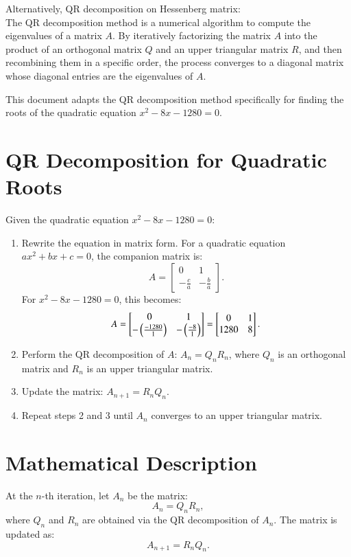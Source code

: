 \documentclass[journal]{IEEEtran}
\begin{document}
Alternatively, QR decomposition on Hessenberg matrix:\\
The QR decomposition method is a numerical algorithm to compute the eigenvalues of a matrix \( A \). By iteratively factorizing the matrix \( A \) into the product of an orthogonal matrix \( Q \) and an upper triangular matrix \( R \), and then recombining them in a specific order, the process converges to a diagonal matrix whose diagonal entries are the eigenvalues of \( A \).

This document adapts the QR decomposition method specifically for finding the roots of the quadratic equation \( x^2 - 8x - 1280 = 0 \).

\section*{QR Decomposition for Quadratic Roots}
Given the quadratic equation \( x^2 - 8x - 1280 = 0 \):
\begin{enumerate}
    \item Rewrite the equation in matrix form. For a quadratic equation \( ax^2 + bx + c = 0 \), the companion matrix is:
    \[
    A = \begin{bmatrix}
    0 & 1 \\
    -\frac{c}{a} & -\frac{b}{a}
    \end{bmatrix}.
    \]
    For \( x^2 - 8x - 1280 = 0 \), this becomes:
    \[
    A = \begin{bmatrix}
    0 & 1 \\
    -\left(\frac{-1280}{1}\right) & -\left(\frac{-8}{1}\right)
    \end{bmatrix} = \begin{bmatrix}
    0 & 1 \\
    1280 & 8
    \end{bmatrix}.
    \]
    \item Perform the QR decomposition of \( A \): \( A_n = Q_n R_n \), where \( Q_n \) is an orthogonal matrix and \( R_n \) is an upper triangular matrix.
    \item Update the matrix: \( A_{n+1} = R_n Q_n \).
    \item Repeat steps 2 and 3 until \( A_n \) converges to an upper triangular matrix.
\end{enumerate}
\section*{Mathematical Description}
At the \(n\)-th iteration, let \( A_n \) be the matrix:
\[
A_n = Q_n R_n,
\]
where \( Q_n \) and \( R_n \) are obtained via the QR decomposition of \( A_n \). The matrix is updated as:
\[
A_{n+1} = R_n Q_n.
\]
\end{document}
